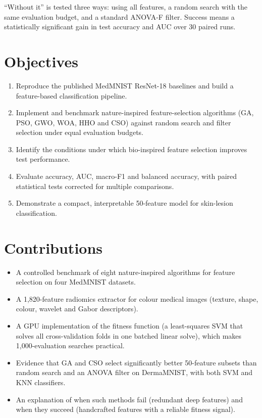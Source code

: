 \documentclass[12pt,a4paper]{report}
\begin{document}
``Without it'' is tested three ways: using all features, a random search with the same evaluation budget, and a
standard ANOVA-F filter. Success means a statistically significant gain in test accuracy and AUC over 30 paired runs.

\section{Objectives}
\begin{enumerate}
  \item Reproduce the published MedMNIST ResNet-18 baselines and build a feature-based classification pipeline.
  \item Implement and benchmark nature-inspired feature-selection algorithms (GA, PSO, GWO, WOA, HHO and CSO)
        against random search and filter selection under equal evaluation budgets.
  \item Identify the conditions under which bio-inspired feature selection improves test performance.
  \item Evaluate accuracy, AUC, macro-F1 and balanced accuracy, with paired statistical tests corrected for
        multiple comparisons.
  \item Demonstrate a compact, interpretable 50-feature model for skin-lesion classification.
\end{enumerate}

\section{Contributions}
\begin{itemize}
  \item A controlled benchmark of eight nature-inspired algorithms for feature selection on four MedMNIST datasets.
  \item A 1,820-feature radiomics extractor for colour medical images (texture, shape, colour, wavelet and Gabor
        descriptors).
  \item A GPU implementation of the fitness function (a least-squares SVM that solves all cross-validation folds in
        one batched linear solve), which makes 1,000-evaluation searches practical.
  \item Evidence that GA and CSO select significantly better 50-feature subsets than random search and an ANOVA
        filter on DermaMNIST, with both SVM and KNN classifiers.
  \item An explanation of when such methods fail (redundant deep features) and when they succeed (handcrafted
        features with a reliable fitness signal).
\end{itemize}
\end{document}
